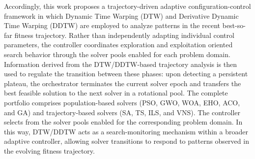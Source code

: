 \documentclass[review]{elsarticle}
\begin{document}
Accordingly, this work proposes a trajectory-driven adaptive configuration-control framework in which Dynamic Time Warping (DTW) \cite{berndt1994using} and Derivative Dynamic Time Warping (DDTW) \cite{keogh2001derivative} are employed to analyze patterns in the recent best-so-far fitness trajectory. Rather than independently adapting individual control parameters, the controller coordinates exploration and exploitation oriented search behavior through the solver pools enabled for each problem domain. Information derived from the DTW/DDTW-based trajectory analysis is then used to regulate the transition between these phases: upon detecting a persistent plateau, the orchestrator terminates the current solver epoch and transfers the best feasible solution to the next solver in a rotational pool. The complete portfolio comprises population-based solvers (PSO, GWO, WOA, EHO, ACO, and GA) and trajectory-based solvers (SA, TS, ILS, and VNS). The controller selects from the solver pools enabled for the corresponding problem domain. In this way, DTW/DDTW acts as a search-monitoring mechanism within a broader adaptive controller, allowing solver transitions to respond to patterns observed in the evolving fitness trajectory.
\end{document}

